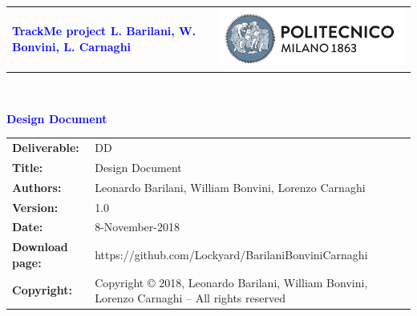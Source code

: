 




\begin{titlepage}



{\begin{table}[t!]
\centering
\begin{tabu} to \textwidth { X[1.3,r,p] X[1.7,l,p] }
\textcolor{Blue}
{\textbf{\small{TrackMe project L. Barilani, W. Bonvini, L. Carnaghi}}} & \includegraphics[scale=0.5]{Images/PolimiLogo}
\end{tabu}
\end{table}}~\\ [7cm]


\begin{flushleft}

{\textcolor{Blue}{\textbf{\Huge{Design Document}}}} \\ [1cm]

\end{flushleft}
	
\end{titlepage}

\begin{table}[h!]
\begin{tabu} to \textwidth { X[0.3,r,p] X[0.7,l,p] }
\hline

\textbf{Deliverable:} & DD\\
\textbf{Title:} & Design Document \\
\textbf{Authors:} & Leonardo Barilani, William Bonvini, Lorenzo Carnaghi \\
\textbf{Version:} & 1.0 \\ 
\textbf{Date:} & 8-November-2018 \\
\textbf{Download page:} & https://github.com/Lockyard/BarilaniBonviniCarnaghi \\
\textbf{Copyright:} & Copyright © 2018, Leonardo Barilani, William Bonvini, Lorenzo Carnaghi – All rights reserved \\
\hline
\end{tabu}
\end{table}
\color{secred}




